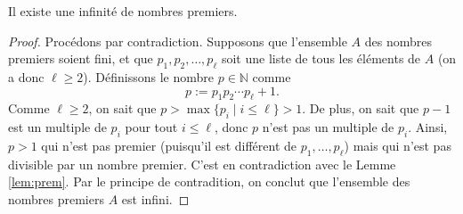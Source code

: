 \documentclass[french,course,oneside,theoremnosection]{lecture}
\newcommand{\N}{\mathbb{N}}
\begin{document}
\begin{theorem}
Il existe une infinité de nombres premiers.
\end{theorem}
\begin{proof}
Procédons par contradiction. Supposons que l'ensemble $A$ des nombres premiers soient fini, et que $p_1, p_2, \ldots, p_\ell$ soit une liste de tous les éléments de $A$ (on a donc $\ell\geq 2$). Définissons le nombre $p\in \N$ comme
\[
p:=p_1p_2\cdots p_\ell+1.
\]
Comme $\ell\geq 2$, on sait que $p>\max\{p_i \mid i \leq \ell\}>1$. De plus, on sait que $p-1$ est un multiple de $p_i$ pour tout $i\leq \ell$, donc $p$ n'est pas un multiple de $p_i$. Ainsi, $p>1$ qui n'est pas premier (puisqu'il est différent de $p_1, \ldots, p_\ell$) mais qui n'est pas divisible par un nombre premier. C'est en contradiction avec le Lemme \ref{lem:prem}. Par le principe de contradition, on conclut que l'ensemble des nombres premiers $A$ est infini.
\end{proof}
\end{document}
